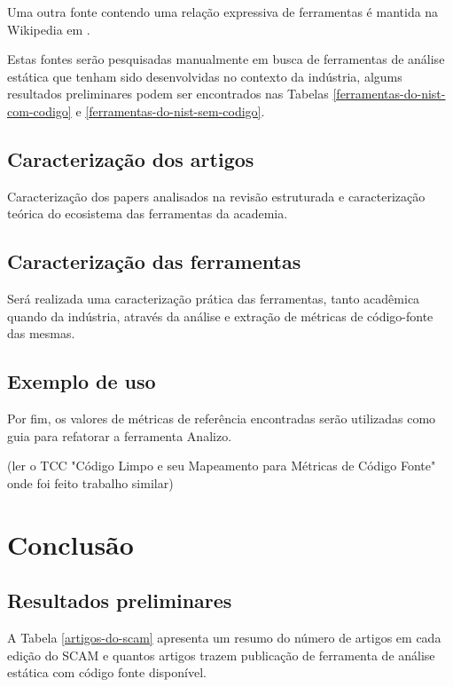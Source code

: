 \documentclass[qual, classic, a4paper]{ufbathesis}
\begin{document}
Uma outra fonte contendo uma relação expressiva de ferramentas é mantida na
Wikipedia em .

Estas fontes serão pesquisadas manualmente em busca de ferramentas de análise
estática que tenham sido desenvolvidas no contexto da indústria, algums
resultados preliminares podem ser encontrados nas Tabelas
\ref{ferramentas-do-nist-com-codigo} e \ref{ferramentas-do-nist-sem-codigo}.

\section{Caracterização dos artigos}

Caracterização dos papers analisados na revisão estruturada e caracterização
teórica do ecosistema das ferramentas da academia.

\section{Caracterização das ferramentas}

Será realizada uma caracterização prática das ferramentas, tanto acadêmica
quando da indústria, através da análise e extração de métricas de código-fonte
das mesmas.


\section{Exemplo de uso}

Por fim, os valores de métricas de referência encontradas serão utilizadas
como guia para refatorar a ferramenta Analizo.

(ler o TCC "Código Limpo e seu Mapeamento para Métricas de Código Fonte" onde
foi feito trabalho similar)

\chapter{Conclusão}

\section{Resultados preliminares}\label{resultados}

A Tabela \ref{artigos-do-scam} apresenta um resumo do número de artigos em
cada edição do SCAM e quantos artigos trazem publicação de ferramenta de análise
estática com código fonte disponível.
\end{document}
